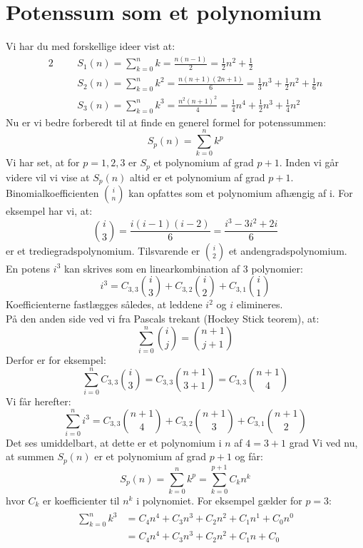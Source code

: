 \section{Potenssum som et polynomium}
Vi har du med forskellige ideer vist at:
\begin{alignat}{2}
&&&S_1(n)=\sum_{k=0}^{n}k=\frac{n(n-1)}{2}=\frac{1}{2}n^2+\frac{1}{2}\\
&&&S_2(n)=\sum_{k=0}^{n}k^2=\frac{n(n+1)(2n+1)}{6}=\frac{1}{3}n^3+\frac{1}{2}n^2+\frac{1}{6}n\\
&&&S_3(n)=\sum_{k=0}^{n}k^3=\frac{n^2(n+1)^2}{4}=\frac{1}{4}n^4+\frac{1}{2}n^3+\frac{1}{4}n^2
\end{alignat}
Nu er vi bedre forberedt til at finde en generel formel for potenssummen:
\[S_p(n)=\sum_{k=0}^{n}k^p\]
Vi har set, at for \(p=1,2,3\) er \(S_p\) et polynomium af grad \(p+1\). Inden vi går videre vil vi vise at \(S_p(n)\) altid er et polynomium af grad \(p+1\).
Binomialkoefficienten \(\binom{i}{n}\) kan opfattes som et polynomium afhængig af i. For eksempel har vi, at:
\[\binom{i}{3}=\frac{i(i-1)(i-2)}{6}=\frac{i^3-3i^2+2i}{6}\]
er et trediegradspolynomium. Tilsvarende er \(\binom{i}{2}\) et andengradspolynomium.\\
En potens \(i^3\) kan skrives som en linearkombination af 3 polynomier:
\[i^3=C_{3,3}\binom{i}{3}+C_{3,2}\binom{i}{2}+C_{3,1}\binom{i}{1}\]
Koefficienterne fastlægges således, at leddene \(i^2\) og \(i\) elimineres.\\
På den anden side ved vi fra Pascals trekant (Hockey Stick teorem), at:
\[\sum_{i=0}^{n}\binom{i}{j}=\binom{n+1}{j+1}\]
Derfor er for eksempel:
\[\sum_{i=0}^{n}C_{3,3}\binom{i}{3}=C_{3,3}\binom{n+1}{3+1}=C_{3,3}\binom{n+1}{4}\]
Vi får herefter:
\[\sum_{i=0}^{n}i^3=C_{3,3}\binom{n+1}{4}+C_{3,2}\binom{n+1}{3}+C_{3,1}\binom{n+1}{2}\]
Det ses umiddelbart, at dette er et polynomium i \(n\) af \(4=3+1\) grad
Vi ved nu, at summen \(S_p(n)\) er et polynomium af grad \(p+1\) og får:
\[S_p(n)=\sum_{k=0}^{n}k^p=\sum_{k=0}^{p+1}C_{k}n^k\]
hvor \(C_{k}\) er koefficienter til \(n^k\) i polynomiet. For eksempel gælder for \(p=3\):
\begin{gather}
\begin{split}
\sum_{k=0}^{n}k^3&=C_{4}n^4+C_{3}n^3+C_{2}n^2+C_{1}n^1+C_{0}n^0\\
&=C_{4}n^4+C_{3}n^3+C_{2}n^2+C_{1}n+C_{0}\label{k3forn}
\end{split}
\end{gather}

